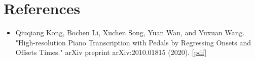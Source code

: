 \documentclass{article}
\begin{document}
\FloatBarrier
\section{References}
\begin{itemize}
    \item Qiuqiang Kong, Bochen Li, Xuchen Song, Yuan Wan, and Yuxuan Wang. "High-resolution Piano Transcription with Pedals by Regressing Onsets and Offsets Times." arXiv preprint arXiv:2010.01815 (2020). \href{https://arxiv.org/pdf/2010.01815.pdf}{[pdf]}
\end{itemize}
\end{document}
